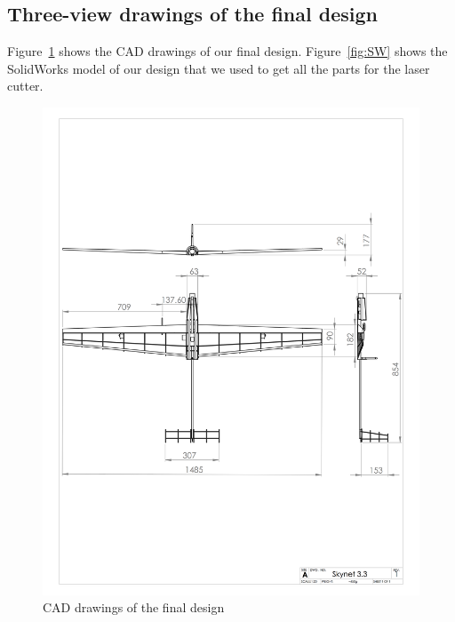 \documentclass[11pt]{article}
\begin{document}
\subsection{Three-view drawings of the final design}

Figure~\ref{fig:CAD} shows the CAD drawings of our final design. Figure~\ref{fig:SW} shows the SolidWorks model of our design that we used to get all the parts for the laser cutter.

\begin{figure}[h!]
  \centering
  \includegraphics[width=\textwidth]{Figures/CAD/Aircraft_Design_3-3.png}
  \caption{CAD drawings of the final design}\label{fig:CAD}
\end{figure}
\end{document}
